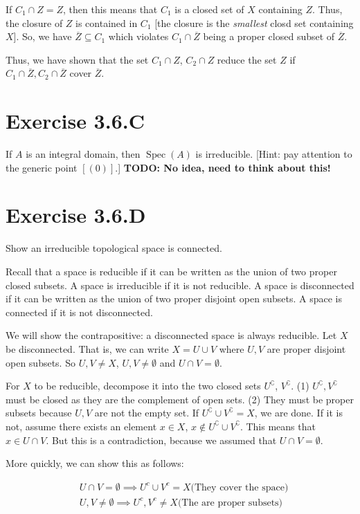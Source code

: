 \documentclass{book}
\newcommand{\Spec}{\operatorname{Spec}}
\renewcommand{\c}{\complement} %
\theoremstyle{definition}
\begin{document}
If $C_1 \cap Z = Z$, then this means that $C_1$ is a closed set of $X$ containing 
$Z$. Thus, the closure of $Z$ is contained in $C_1$ [the closure is the 
\emph{smallest} closd set containing $X$]. So, we have $\overline{Z} \subseteq C_1$
which violates $C_1 \cap \overline{Z}$ being a proper closed subset of $\overline{Z}$.

Thus, we have shown that the set $C_1 \cap Z$, $C_2 \cap Z$ reduce the set
$Z$ if $C_1 \cap \overline Z, C_2 \cap \overline Z$ cover $\overline Z$. 

\section{Exercise 3.6.C}
If $A$ is an integral domain, then $\Spec(A)$ is irreducible. [Hint:
pay attention to the generic point $[(0)]$.]
\textbf{TODO: No idea, need to think about this!}


\section{Exercise 3.6.D}
Show an irreducible topological space is connected.

Recall that a space is reducible if it can be written as the union of
two proper closed subsets. A space is irreducible if it is not
reducible. A space is disconnected if it can be written as the union
of two proper disjoint open subsets. A space is connected if it is
not disconnected.

We will show the contrapositive: a disconnected space is always
reducible. Let $X$ be disconnected. That is, we can write $X = U \cup V$
where $U, V$ are proper disjoint open subsets. So
$U, V \neq X$, $U, V \neq \emptyset$ and $U \cap V = \emptyset$. 

For $X$ to be reducible, decompose it into the two closed sets $U^\c$,
$V^\c$.  (1) $U^\c, V^\c$ must be closed as they are the
complement of open sets. (2) They must be proper subsets because $U, V$ 
are not the empty set. If $U^\c \cup V^\c = X$, we are done.
If it is not, assume there exists an element $x \in X$, $x \not \in U^\c \cup V^\c$.
This means that $x \in U \cap V$. But this is a contradiction, because we assumed
that $U \cap V = \emptyset$.


More quickly, we can show this as follows:

\begin{align*}
&U \cap V = \emptyset \implies U^c \cup V^c = X \text{(They cover the space)} \\
&U, V \neq \emptyset \implies U^c, V^c \neq X \text{(The are proper subsets)}
\end{align*}
\end{document}
